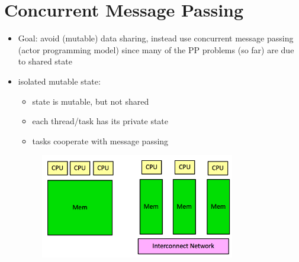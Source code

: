 \documentclass[a4paper]{article}
\begin{document}
\section{Concurrent Message Passing}
\begin{itemize}
\item Goal: avoid (mutable) data sharing, instead use concurrent message passing (actor programming model) since many of the PP problems (so far) are due to shared state
\item isolated mutable state: 
\begin{itemize}
\item state is mutable, but not shared
\item each thread/task has its private state
\item tasks cooperate with message passing
\end{itemize}
 \begin{figure}[ht]
\centering
\includegraphics[width=85mm]{Figures/image1.jpg}
\end{figure}


\end{itemize}
\end{document}

